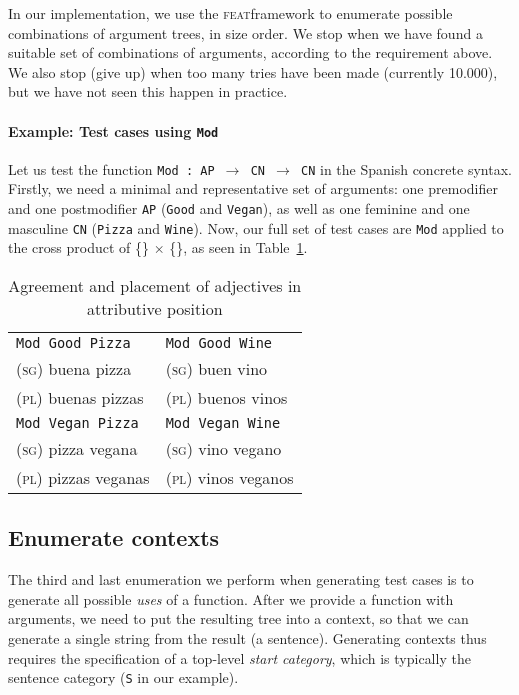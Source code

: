 \documentclass[11pt]{article}
\def\t#1{\texttt{#1}}
\def\feat{\textsc{feat}}
\begin{document}
In our implementation, we use the \feat framework \cite{feat} to enumerate possible combinations of argument trees, in size order. We stop when we have found a suitable set of combinations of arguments, according to the requirement above. We also stop (give up) when too many tries have been made (currently 10.000), but we have not seen this happen in practice.

\paragraph{Example: Test cases using \t{Mod}} Let us test the function
\t{Mod : AP $\rightarrow$ CN $\rightarrow$ CN} in the Spanish
concrete syntax.
Firstly, we need a minimal and representative set of arguments:
one premodifier and one postmodifier \t{AP} (\t{Good} and
\t{Vegan}), as well as one feminine and one masculine
\t{CN} (\t{Pizza} and \t{Wine}). Now, our full set of test cases are
\t{Mod} applied to the cross product of \{\} $\times$ \{\}, as seen in Table~\ref{tab:adjAttr}.

\begin{table}[h]
\centering
\begin{tabular}{| l | l |}
\hline
\t{Mod Good Pizza}   & \t{Mod Good Wine} \\ 
\textsc{(sg)} buena pizza             & \textsc{(sg)} buen vino \\
\textsc{(pl)} buenas pizzas           & \textsc{(pl)} buenos vinos \\ \hline

\t{Mod Vegan Pizza}   & \t{Mod Vegan Wine} \\ 
\textsc{(sg)} pizza vegana            & \textsc{(sg)} vino vegano \\
\textsc{(pl)} pizzas veganas          & \textsc{(pl)} vinos veganos \\ \hline
\end{tabular}
\caption{Agreement and placement of adjectives in attributive position}
\label{tab:adjAttr}
\end{table}

\subsection{Enumerate contexts} The third and last enumeration we
perform when generating test cases is to generate all possible
\emph{uses} of a function. After we provide a function with arguments,
we need to put the resulting tree into a context, so that we can generate a
single string from the result (a sentence). Generating contexts thus requires the specification of a top-level \emph{start category}, which is typically the sentence category (\t{S} in our example).
\end{document}
